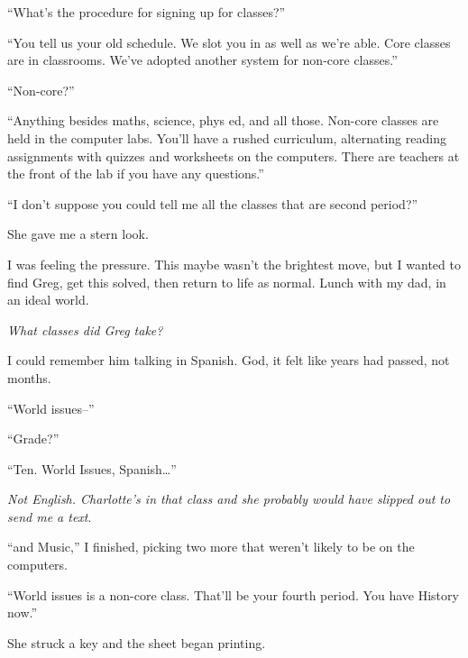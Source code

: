 ``What's the procedure for signing up for classes?''



``You tell us your old schedule.  We slot you in as well as we're able.  Core classes are in classrooms.  We've adopted another system for non-core classes.''



``Non-core?''



``Anything besides maths, science, phys ed, and all those.  Non-core classes are held in the computer labs.  You'll have a rushed curriculum, alternating reading assignments with quizzes and worksheets on the computers.  There are teachers at the front of the lab if you have any questions.''



``I don't suppose you could tell me all the classes that are second period?''



She gave me a stern look.



I was feeling the pressure.  This maybe wasn't the brightest move, but I wanted to find Greg, get this solved, then return to life as normal.  Lunch with my dad, in an ideal world.



\emph{What classes did Greg take?}



I could remember him talking in Spanish.  God, it felt like years had passed, not months.



``World issues--''



``Grade?''



``Ten.  World Issues, Spanish\ldots''



\emph{Not English.  Charlotte's in that class and she probably would have slipped out to send me a text}.



``\ldotsHistory and Music,'' I finished, picking two more that weren't likely to be on the computers.



``World issues is a non-core class.  That'll be your fourth period.  You have History now.''



She struck a key and the sheet began printing.



